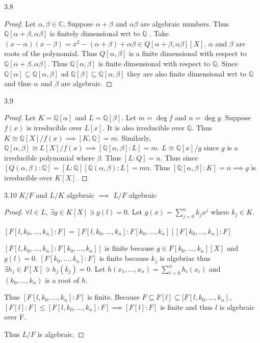 \documentclass{article}
\newcommand{\C}{\mathbb{C}}
\newcommand{\Q}{\mathbb{Q}}
\begin{document}
\bigskip

\begin{PROB}{3.8}\label{Problem 3.8.}
\end{PROB}
\begin{proof}
    Let $\alpha, \beta \in \C$. Suppose $\alpha + \beta$ and $\alpha \beta$ are algebraic numbers. Thus $\Q[\alpha + \beta, \alpha \beta]$ is finitely dimensional wrt to $\Q$ . Take $(x - \alpha)(x - \beta) = x^2 - (\alpha + \beta) + \alpha \beta \in Q[\alpha + \beta, \alpha \beta] [X]$. $\alpha$ and $\beta$ are roots of the polynomial. Thus $Q[\alpha , \beta]$ is a finite dimensional with respect to $\Q[\alpha + \beta, \alpha \beta]$. Thus $\Q[\alpha, \beta]$ is finite dimensional with respect to $\Q$. Since $\Q[\alpha] \subseteq \Q[\alpha, \beta]$ ad $\Q[\beta] \subseteq \Q[\alpha, \beta]$ they are also finite dimensional wrt to $\Q$ and thus $\alpha$ and $\beta$ are algebraic.       
\end{proof}

\bigskip

\begin{PROB}{3.9}\label{Problem 3.9.}
\end{PROB}
\begin{proof}
    Let $K = \Q[\alpha]$ and $L = \Q[\beta]$.  
    Let $m = \deg f$ and $n = \deg g$.      
    Suppose $f(x)$ is irreducible over $L[x]$. It is also irreducible over $\Q$. Thus $K \cong \Q[X]/f(x) \implies [K, \Q] = m$. Similarly, $\Q[\alpha, \beta] \cong L[X] / f(x) \implies [\Q[\alpha, \beta] : L] = m$. $L \cong \Q [x]/ g$ since $g$ is a irreducible polynomial where $\beta$. Thus $[L : Q] = n$. Thus since $[Q(\alpha, \beta) : \Q] = [L : \Q][\Q(\alpha, \beta) : L] = mn$. Thus $[\Q[\alpha, \beta] : K] = n \implies g$ is irreducible over $K[X]$.             
\end{proof}

\bigskip

\begin{PROB}{3.10}\label{Problem 3.10.}
    $K / F$ and $L / K$ algebraic $\implies$ $L / F$ algebraic    
\end{PROB}
\begin{proof}
    $\forall l \in L$, $\exists g \in K[X] \ni g(l) = 0$. Let $g(x) = \sum_{j = 0}^{n} k_j x^j$ where $k_j \in K$. 
    
    $[F[l, k_0, \dots, k_n] : F] = [F[l, k_0, \dots, k_n] : F[k_0, \dots, k_n]][F[k_0, \dots, k_n] : F]$
    
    $[F[l, k_0, \dots, k_n] : F[k_0, \dots, k_n]]$ is finite because $g \in F[k_0, \dots, k_n][X]$ and $g(l) = 0$. $[F[k_0, \dots, k_n] : F]$ is finite because $k_j$ is algebriac thus $\exists h_j \in F[X] \ni h_j(k_j) = 0$. Let $h(x_1, \dots, x_n) = \sum_{i = 0}^{n}h_i(x_i)$ and $(k_0, \dots, k_n)$ is a root of $h$. 
    
    Thus $[F[l, k_0, \dots, k_n] : F]$ is finite. Because $F \subseteq F[l] \subseteq [F[l, k_0, \dots, k_n]$,  $[F[l] : F] \leq [F[l, k_0, \dots, k_n] : F] \implies [F[l] : F] $ is finite and thus $l$ is algebraic over F. 
    
    Thus $L / F$ is algebraic.  
\end{proof}
\end{document}
